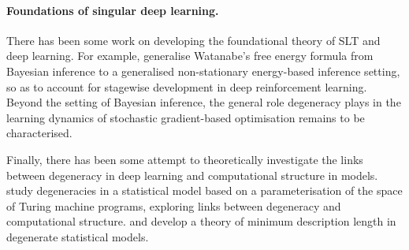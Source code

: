 \documentclass[11pt]{article}
\begin{document}
\paragraph{Foundations of singular deep learning.}

There has been some work on developing the foundational theory of SLT and deep learning.
%
For example, \citet{Elliott+2026} generalise Watanabe's free energy formula from Bayesian inference to a generalised non-stationary energy-based inference setting, so as to account for stagewise development in deep reinforcement learning.
%
Beyond the setting of Bayesian inference, the general role degeneracy plays in the learning dynamics of stochastic gradient-based optimisation remains to be characterised.

Finally, there has been some attempt to theoretically investigate the links between degeneracy in deep learning and computational structure in models.
%
\citet{Clift+2021,Waring2021,Xu2021,Murfet2024,Murfet+Troiani2025} study degeneracies in a statistical model based on a parameterisation of the space of Turing machine programs, exploring links between degeneracy and computational structure.
% 
\citet[][Chapter~5]{Lau2025} and \citet{Urdshals+2025} develop a theory of minimum description length in degenerate statistical models.



\clearpage



\begin{pdfonly}
\end{pdfonly}










\end{document}
